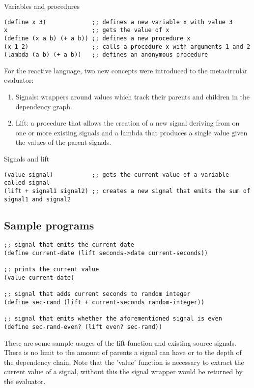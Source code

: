 Variables and procedures
\begin{lstlisting}
(define x 3)             ;; defines a new variable x with value 3
x                        ;; gets the value of x
(define (x a b) (+ a b)) ;; defines a new procedure x
(x 1 2)                  ;; calls a procedure x with arguments 1 and 2
(lambda (a b) (+ a b))   ;; defines an anonymous procedure
\end{lstlisting}

\newpage
For the reactive language, two new concepts were introduced to the metacircular evaluator:

\begin{enumerate}
	\item Signals: wrappers around values which track their parents and children in the dependency graph. 
	\item Lift: a procedure that allows the creation of a new signal deriving from on one or more existing signals and a lambda that produces a single value given the values of the parent signals.
\end{enumerate}

Signals and lift
\begin{lstlisting}
(value signal)           ;; gets the current value of a variable called signal
(lift + signal1 signal2) ;; creates a new signal that emits the sum of signal1 and signal2
\end{lstlisting}

\subsection{Sample programs}

\begin{lstlisting}
;; signal that emits the current date
(define current-date (lift seconds->date current-seconds)) 

;; prints the current value
(value current-date)       

;; signal that adds current seconds to random integer                                
(define sec-rand (lift + current-seconds random-integer))  

;; signal that emits whether the aforementioned signal is even
(define sec-rand-even? (lift even? sec-rand))			   
\end{lstlisting}

These are some sample usages of the lift function and existing source signals. There is no limit to the amount of parents a signal can have or to the depth of the dependency chain. Note that the 'value' function is necessary to extract the current value of a signal, without this the signal wrapper would be returned by the evaluator. 

